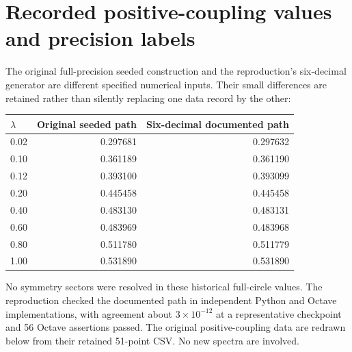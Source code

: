 \documentclass[11pt,a4paper,oneside]{report}
\numberwithin{equation}{chapter}
\begin{document}
\section{Recorded positive-coupling values and precision labels}

The original full-precision seeded construction and the reproduction's
six-decimal generator are different specified numerical inputs.
Their small differences are retained rather than silently replacing
one data record by the other:
\begin{center}
\begin{tabular}{@{}lrr@{}}
\toprule
\(\lambda\)&Original seeded path&Six-decimal documented path\\
\midrule
0.02&0.297681&0.297632\\
0.10&0.361189&0.361190\\
0.12&0.393100&0.393099\\
0.20&0.445458&0.445458\\
0.40&0.483130&0.483131\\
0.60&0.483969&0.483968\\
0.80&0.511780&0.511779\\
1.00&0.531890&0.531890\\
\bottomrule
\end{tabular}
\end{center}
No symmetry sectors were resolved in these historical full-circle
values. The reproduction checked the documented path in independent
Python and Octave implementations, with agreement about
\(3\times10^{-12}\) at a representative checkpoint and 56 Octave
assertions passed. The original positive-coupling data are redrawn
below from their retained 51-point CSV. No new spectra are involved.
\end{document}
